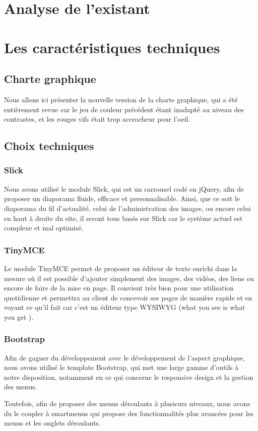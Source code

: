 \documentclass[11pt]{report}
\begin{document}
\chapter{Analyse de l'existant}

\chapter{Les caractéristiques techniques}
\section{Charte graphique}
Nous allons ici présenter la nouvelle version de la charte graphique, qui a été 
entièrement revue car le jeu de couleur précédent étant inadapté au niveau des 
contrastes, et les rouges vifs était trop accrocheur pour l'oeil.

\section{Choix techniques}
\subsection{Slick}
Nous avons utilisé le module Slick, qui est un carrousel codé en jQuery, afin
de proposer un diaporama fluide, efficace et personnalisable. Ainsi, que ce soit
le diaporama du fil d'actualité, celui de l'administration des images, ou encore
celui en haut à droite du site, il seront tous basés sur Slick car le système
actuel est complexe et mal optimisé.

\subsection{TinyMCE}
Le module TinyMCE permet de proposer un éditeur de texte enrichi dans la mesure
où il est possible d'ajouter simplement des images, des vidéos, des liens ou
encore de faire de la mise en page. Il convient très bien pour une utilisation
quotidienne et permettra au client de concevoir ses pages de manière rapide et
en voyant ce qu'il fait car c'est un éditeur type \og WYSIWYG \fg{} (\og what you
see is what you get \fg{}).

\subsection{Bootstrap}
Afin de gagner du développement avec le développement de l'aspect graphique,
nous avons utilisé le template Bootstrap, qui met une large gamme d'outils à
notre disposition, notamment en ce qui concerne le responsive design et la
gestion des menus. \\
\par Toutefois, afin de proposer des menus déroulants à plusieurs niveaux, nous
avons du le coupler à \og smartmenus \fg{} qui propose des fonctionnalités plus
avancées pour les menus et les onglets déroulants.
\end{document}
